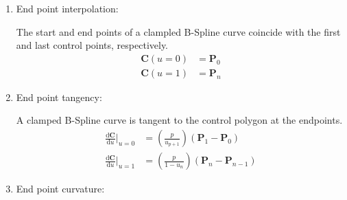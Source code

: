 \begin{enumerate}
        
        The $k$-th derivative of a B-Spline curve is also given by:
        \begin{align*}
            \frac{\mathrm{d}^k\mathbf{C}}{\mathrm{d}u^k} = \sum_{i=0}^{n-k} N_{i,p-k}(u) \, \mathbf{P}_{i}^{(k)}
        \end{align*}
        where:
        \begin{equation*}
            \mathbf{P}_{i}^{(k)} =  \begin{cases}
                \mathbf{P}_{i} & \text{if $k=0$}\\
                \frac{p-k+1}{u_{i+p+1}-u_{i+k}}\, (\mathbf{P}_{i+1}^{(k-1)} - \mathbf{P}_{i}^{(k)}) &\text{if $k>0$}
                \end{cases}
        \end{equation*}
        
        evaluated at the knot vector $U^{(k)}$ given by:
        \begin{align*}
            & U^{(k)} = [\underbrace{0,\, \dots,\, 0}_{p-k+1},\, \underbrace{u_{p+1},\, \dots,\, u_{n}}_{n-p},\, \underbrace{1,\, \dots,\, 1}_{p-k+1}]
        \end{align*}
    

    \item End point interpolation:
    
    The start and end points of a clampled B-Spline curve coincide with the first and last control points, respectively.
    \begin{align*}
        \mathbf{C}(u=0) &= \mathbf{P}_{0} \\
        \mathbf{C}(u=1) &= \mathbf{P}_{n}
    \end{align*}
    
    
    \item End point tangency:
    
    A clamped B-Spline curve is tangent to the control polygon at the endpoints.
    \begin{align*}
        \frac{\mathrm{d}\mathbf{C}}{\mathrm{d}u}\Bigr|_{u=0} &= \left( \frac{p}{u_{p+1}} \right) (\mathbf{P}_{1} - \mathbf{P}_{0}) \\
        \frac{\mathrm{d}\mathbf{C}}{\mathrm{d}u}\Bigr|_{u=1} &= \left( \frac{p}{1-u_{n}} \right) (\mathbf{P}_{n} - \mathbf{P}_{n-1})
    \end{align*}
    
    
    \item End point curvature:
    

\end{enumerate}
